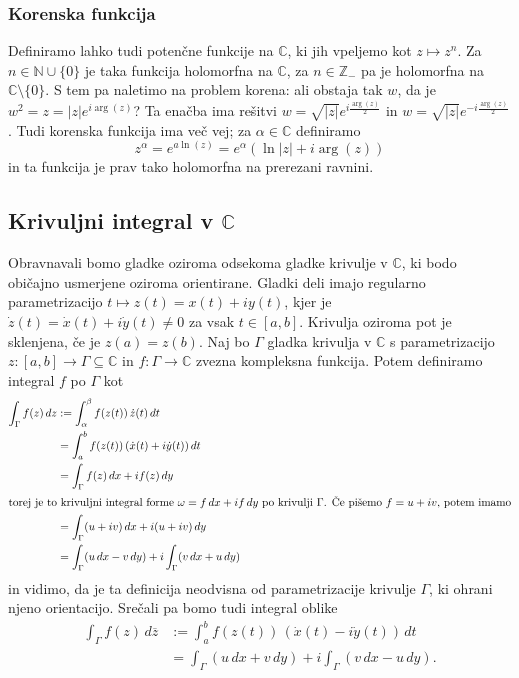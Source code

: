 \documentclass[10pt, a4paper]{article}
\newcommand{\N}{\mathbb {N}}
\newcommand{\Z}{\mathbb {Z}}
\newcommand{\C}{\mathbb {C}}
\begin{document}
\subsubsection{Korenska funkcija}

Definiramo lahko tudi potenčne funkcije na $\C$, ki jih vpeljemo kot $z \mapsto z^n$.
Za $n \in \N \cup \{0\}$ je taka funkcija holomorfna na $\C$, za $n \in \Z_-$
pa je holomorfna na $\C \setminus \{0\}$.
S tem pa naletimo na problem korena: ali obstaja tak $w$, da je $w^2 = z = |z| e^{i\arg (z)}$?
Ta enačba ima rešitvi $w = \sqrt{|z|} e^{i \frac{\arg (z)}{2}}$ in $w = \sqrt{|z|} e^{-i \frac{\arg (z)}{2}}$.
Tudi korenska funkcija ima več vej; za $\alpha \in \C$ definiramo 
$$z^\alpha = e^{a \ln (z)} = e^\alpha (\ln |z| + i \arg (z))$$
in ta funkcija je prav tako holomorfna na prerezani ravnini.

\subsection{Krivuljni integral v $\C$}

Obravnavali bomo gladke oziroma odsekoma gladke krivulje v $\C$,
ki bodo običajno usmerjene oziroma orientirane.
Gladki deli imajo regularno parametrizacijo 
$t \mapsto z(t) = x(t) + i y(t)$,
kjer je $\dot{z} (t) = \dot{x} (t) + i \dot{y} (t) \neq 0$
za vsak $t \in [a, b]$. 
Krivulja oziroma pot je sklenjena, če je $z(a) = z(b).$
Naj bo $\Gamma$ gladka krivulja v $\C$ s parametrizacijo 
$z: [a, b] \to \Gamma \subseteq \C$
in $f: \Gamma \to \C$ zvezna kompleksna funkcija.
Potem definiramo integral $f$ po $\Gamma$ kot 
\begin{align*}
  \int_\Gamma f(z)\, dz &:= \int_{\alpha} ^\beta f(z (t))\, \dot{z} (t)\, dt\\
  &= \int_a ^b f(z(t))\, (\dot{x} (t) + i \dot{y} (t))\, dt\\
  &= \int_\Gamma f(z)\, dx + i f(z)\, dy\\
\intertext{torej je to krivuljni integral forme $\omega = f\, dx + i f\, dy$
po krivulji $\Gamma$. Če pišemo $f = u + iv$, potem imamo}
  &= \int_\Gamma (u + iv)\, dx + i(u + iv)\, dy\\
  &= \int_\Gamma (u\, dx - v\, dy) + i \int_\Gamma (v\, dx + u\, dy)
\end{align*}
in vidimo, da je ta definicija neodvisna od parametrizacije krivulje 
$\Gamma$, ki ohrani njeno orientacijo.
Srečali pa bomo tudi integral oblike 
\begin{align*}
  \int_\Gamma f(z)\, d\overline{z} 
  &:= \int_a ^b f(z(t))\, (\dot{x} (t) - i \dot{y} (t))\, dt\\
  &= \int_\Gamma (u\, dx + v\, dy) + i \int_\Gamma (v\, dx - u\, dy).
\end{align*}
\end{document}
